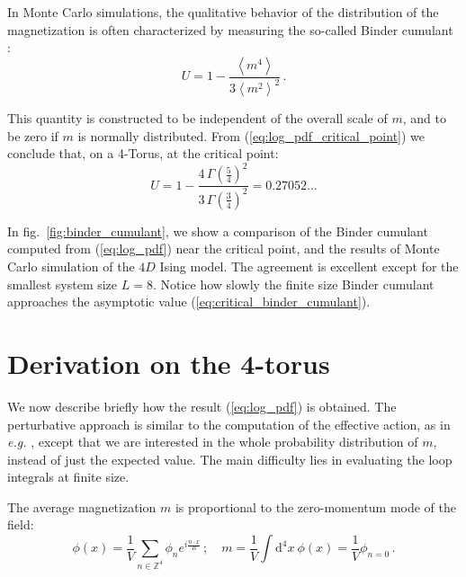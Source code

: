 \documentclass[11pt,a4paper]{article}
\newcommand{\dd}{\mathrm{d}}
\begin{document}
In Monte Carlo simulations, the qualitative behavior of the distribution of the
magnetization is often characterized by measuring the so-called Binder
cumulant \cite{Binder1981}:
\begin{equation}
    \label{eq:binder_cumulant}
    U = 1 - \frac{\left\langle m^4 \right \rangle}
    {3\left\langle m^2 \right \rangle^2}\,.
\end{equation}

This quantity is constructed to be independent of the overall scale of $m$,
and to be zero if $m$ is normally distributed. From
(\ref{eq:log_pdf_critical_point}) we conclude that, on a 4-Torus, at the
critical point:
\begin{equation}
    \label{eq:critical_binder_cumulant}
    U = 1 - \frac{4\,\Gamma\left(\frac{5}{4}\right)^2}
    {3\,\Gamma\left(\frac{3}{4}\right)^2} 
    = 0.27052\ldots
\end{equation}


In fig.~\ref{fig:binder_cumulant}, we show a comparison of the Binder cumulant
computed from (\ref{eq:log_pdf}) near the critical point, and the results of
Monte Carlo simulation of the $4D$ Ising model. The agreement is excellent
except for the smallest system size $L = 8$. Notice how slowly the finite size
Binder cumulant approaches the asymptotic value
(\ref{eq:critical_binder_cumulant}).

\section{Derivation on the 4-torus}
\label{sect:derivation}

We now describe briefly how the result (\ref{eq:log_pdf}) is obtained. The
perturbative approach is similar to the computation of the effective
action, as in \textit{e.g.} \cite{WeinbergEffectiveAction}, except that we are
interested in the whole probability distribution of $m$, instead of
just the expected value. The main difficulty lies in evaluating the loop
integrals at finite size.

The average magnetization $m$ is proportional to the zero-momentum mode of the
field:
\begin{equation}
    \phi(x) = \frac{1}{V} \sum_{n \in \mathbb{Z}^4} \phi_{n} 
    e^{i \frac{n\cdot x}{R}}\,;\quad m = \frac{1}{V}\int\dd^4 x\ \phi(x) = \frac{1}{V}\phi_{n = 0}\,.
\end{equation}
\end{document}
